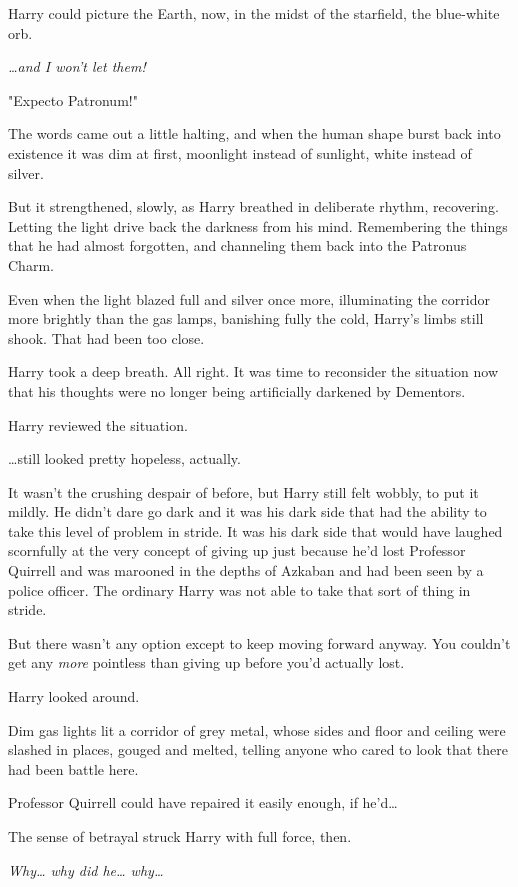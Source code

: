 Harry could picture the Earth, now, in the midst of the starfield, the 
blue-white orb.

\emph{{\ldots}and I won't let them!}

"Expecto Patronum!"

The words came out a little halting, and when the human shape burst back into 
existence it was dim at first, moonlight instead of sunlight, white instead of 
silver.

But it strengthened, slowly, as Harry breathed in deliberate rhythm, 
recovering. Letting the light drive back the darkness from his mind. 
Remembering the things that he had almost forgotten, and channeling them back 
into the Patronus Charm.

Even when the light blazed full and silver once more, illuminating the corridor 
more brightly than the gas lamps, banishing fully the cold, Harry's limbs still 
shook. That had been too close.

Harry took a deep breath. All right. It was time to reconsider the situation 
now that his thoughts were no longer being artificially darkened by Dementors.

Harry reviewed the situation.

{\ldots}still looked pretty hopeless, actually.

It wasn't the crushing despair of before, but Harry still felt wobbly, to put 
it mildly. He didn't dare go dark and it was his dark side that had the ability 
to take this level of problem in stride. It was his dark side that would have 
laughed scornfully at the very concept of giving up just because he'd lost 
Professor Quirrell and was marooned in the depths of Azkaban and had been seen 
by a police officer. The ordinary Harry was not able to take that sort of thing 
in stride.

But there wasn't any option except to keep moving forward anyway. You couldn't 
get any \emph{more} pointless than giving up before you'd actually lost.

Harry looked around.

Dim gas lights lit a corridor of grey metal, whose sides and floor and ceiling 
were slashed in places, gouged and melted, telling anyone who cared to look 
that there had been battle here.

Professor Quirrell could have repaired it easily enough, if he'd{\ldots}

The sense of betrayal struck Harry with full force, then.

\emph{Why{\ldots} why did he{\ldots} why{\ldots}}

